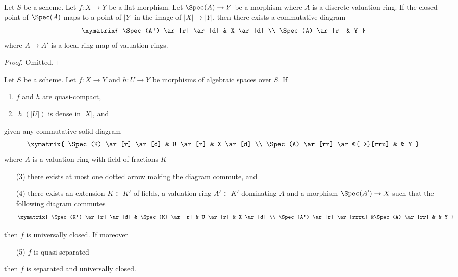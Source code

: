 \begin{lemma}
\label{lemma-lift-valuation-ring-through-flat-morphism}
Let $S$ be a scheme. Let $f : X \to Y$ be a flat morphism.
Let $\Spec(A) \to Y$ be a morphism where $A$ is a discrete
valuation ring. If the closed point of $\Spec(A)$ maps to a
point of $|Y|$ in the image of $|X| \to |Y|$, then there exists
a commutative diagram
$$
\xymatrix{
\Spec(A') \ar[r] \ar[d] & X \ar[d] \\
\Spec(A) \ar[r] & Y
}
$$
where $A \to A'$ is a local ring map of valuation rings.
\end{lemma}

\begin{proof}
Omitted.
\end{proof}

\begin{lemma}
\label{lemma-refined-valuative-criterion-universally-closed}
Let $S$ be a scheme. Let $f : X \to Y$ and $h : U \to Y$ be morphisms of
algebraic spaces over $S$. If
\begin{enumerate}
\item $f$ and $h$ are quasi-compact,
\item $|h|(|U|)$ is dense in $|X|$, and
\end{enumerate}
given any commutative solid diagram
$$
\xymatrix{
\Spec(K) \ar[r] \ar[d] & U \ar[r] & X \ar[d] \\
\Spec(A) \ar[rr] \ar@{-->}[rru] & & Y
}
$$
where $A$ is a valuation ring with field of fractions $K$
\begin{enumerate}
\item[(3)] there exists at most one dotted arrow making the diagram
commute, and
\item[(4)] there exists an extension $K \subset K'$ of fields, a
valuation ring $A' \subset K'$ dominating $A$ and a morphism
$\Spec(A') \to X$ such that the following diagram commutes
$$
\xymatrix{
\Spec(K') \ar[r] \ar[d] & \Spec(K) \ar[r] & U \ar[r] & X \ar[d] \\
\Spec(A') \ar[r] \ar[rrru] &\Spec(A) \ar[rr] & & Y
}
$$
\end{enumerate}
then $f$ is universally closed. If moreover
\begin{enumerate}
\item[(5)] $f$ is quasi-separated
\end{enumerate}
then $f$ is separated and universally closed.
\end{lemma}

